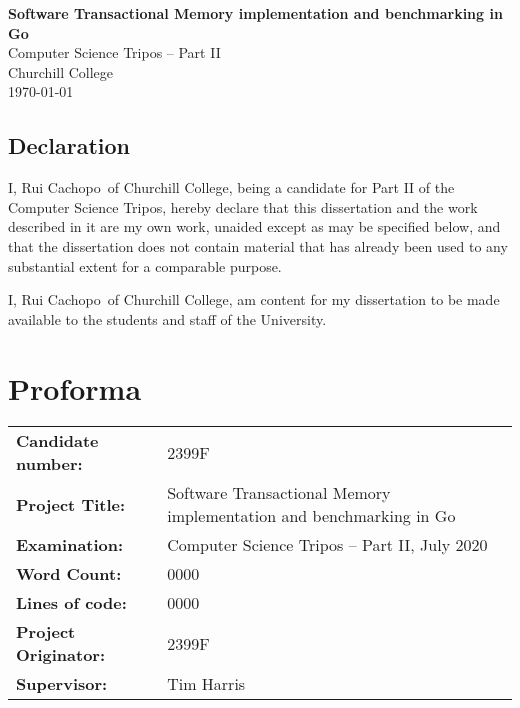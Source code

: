 \documentclass[12pt,a4paper,oneside,openright]{report}
\newcommand{\disstitle}{Software Transactional Memory implementation
  and benchmarking in Go}
\newcommand{\college}{Churchill College}
\newcommand{\studentname}{Rui Cachopo}
\newcommand{\candidatenumber}{2399F} %
\newcommand{\wordcount}{0000}
\newcommand{\loc}{0000}
\newcommand{\originator}{\candidatenumber}
\newcommand{\supervisor}{Tim Harris}
\begin{document}


\pagestyle{empty}


\rightline{\LARGE \textbf{\studentname}}

\vspace*{60mm}
\begin{center}
  \Huge
  \textbf{\disstitle} \\[5mm]
  Computer Science Tripos -- Part II \\[5mm]
  \college \\[5mm]
  \today
\end{center}

\newpage

\section*{Declaration}

I, \studentname\ of \college, being a candidate for Part II of the
Computer Science Tripos, hereby declare that this dissertation and the
work described in it are my own work, unaided except as may be
specified below, and that the dissertation does not contain material
that has already been used to any substantial extent for a comparable
purpose.

I, \studentname\ of \college, am content for my dissertation to be
made available to the students and staff of the University.

\bigskip {}

\medskip {}

\chapter*{Proforma}

\thispagestyle{empty}

{\large
  \begin{tabular}{L{0.3\linewidth} L{0.7\linewidth}}
    \textbf{Candidate number:} & \candidatenumber                      \\
    \textbf{Project Title:}           & \disstitle \\
    \textbf{Examination:}        & Computer Science Tripos -- Part II, July 2020  \\
    \textbf{Word Count:}         & \wordcount  \\
    \textbf{Lines of code:} & \loc \\
    \textbf{Project Originator:} & \originator \\
    \textbf{Supervisor:} & \supervisor \\
  \end{tabular}
}
\end{document}
